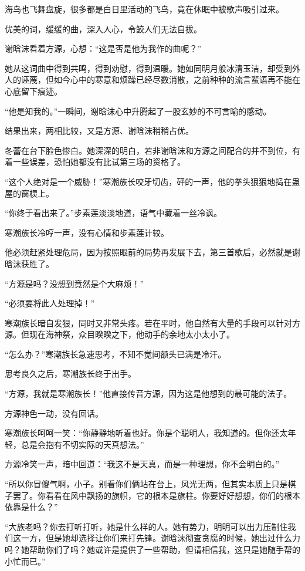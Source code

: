 \begin{this_body}
海鸟也飞舞盘旋，很多都是白日里活动的飞鸟，竟在休眠中被歌声吸引过来。

优美的词，缓缓的曲，深入人心，令鲛人们无法自拔。

谢晗沫看着方源，心想：“这是否是他为我作的曲呢？”

她从这词曲中得到共鸣，得到劝慰，得到温暖。她如同明月般冰清玉洁，却受到外人的诬蔑，但如今心中的寒意和烦躁已经尽数消散，之前种种的流言蜚语再不能在心底留下痕迹。

“他是知我的。”一瞬间，谢晗沫心中升腾起了一股玄妙的不可言喻的感动。

结果出来，两相比较，又是方源、谢晗沫稍稍占优。

冬蕾在台下脸色惨白。她深深的明白，若非谢晗沫和方源之间配合的并不到位，有着一些误差，恐怕她都没有比试第三场的资格了。

“这个人绝对是一个威胁！”寒潮族长咬牙切齿，砰的一声，他的拳头狠狠地捣在蛊屋的窗棂上。

“你终于看出来了。”步素莲淡淡地道，语气中藏着一丝冷讽。

寒潮族长冷哼一声，没有心情和步素莲计较。

他必须赶紧处理危局，因为按照眼前的局势再发展下去，第三首歌后，必然就是谢晗沫获胜了。

“方源是吗？没想到竟然是个大麻烦！”

“必须要将此人处理掉！”

寒潮族长暗自发狠，同时又非常头疼。若在平时，他自然有大量的手段可以针对方源。但现在海神祭，众目睽睽之下，他动手的余地太小太小了。

“怎么办？”寒潮族长急速思考，不知不觉间额头已满是冷汗。

思考良久之后，寒潮族长终于出手。

“方源，我就是寒潮族长！”他直接传音方源，因为这是他想到的最可能的法子。

方源神色一动，没有回话。

寒潮族长呵呵一笑：“你静静地听着也好。你是个聪明人，我知道的。但你还太年轻，总是会抱有不切实际的天真想法。”

方源冷笑一声，暗中回道：“我这不是天真，而是一种理想，你不会明白的。”

“所以你冒傻气啊，小子。别看你们俩站在台上，风光无两，但其实本质上只是棋子罢了。你看看在风中飘扬的旗帜，它的根本是旗柱。你要好好想想，你们的根本依靠是什么？”

“大族老吗？你去打听打听，她是什么样的人。她有势力，明明可以出力压制住我们这一方，但是她却选择让你们来打先锋。谢晗沫彻查贪腐的时候，她出过什么力吗？她帮助你们了吗？她或许是提供了一些帮助，但请相信我，这只是她随手帮的小忙而已。”


\end{this_body}
